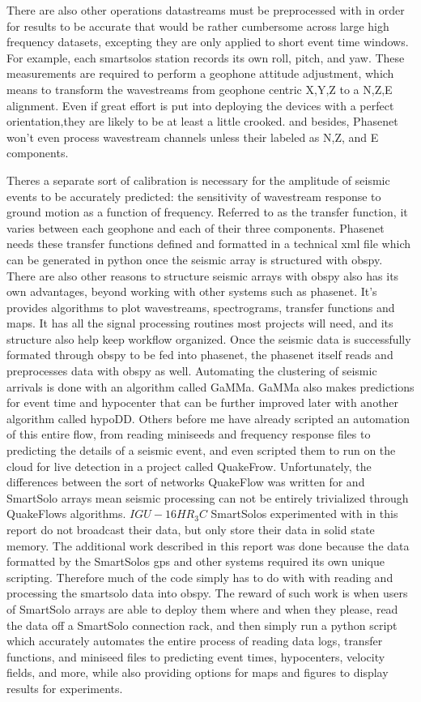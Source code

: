 There are also other operations datastreams must be preprocessed with in order for results to be accurate that would be rather cumbersome across large high frequency datasets, excepting they are only applied to short event time windows. 
For example, each smartsolos station records its own roll, pitch, and yaw. These measurements are required to perform a geophone attitude adjustment, which means to transform the wavestreams from geophone centric X,Y,Z to a  N,Z,E alignment. 
 Even if great effort is put into deploying the devices with a perfect orientation,they are likely to be at least a little crooked. and besides, Phasenet won't even process wavestream channels unless their labeled as N,Z, and E components. 

Theres a separate sort of calibration is necessary for the amplitude of seismic events to be accurately predicted: the sensitivity of wavestream response to ground motion as a function of frequency. Referred to as the transfer function, it varies between each geophone and each of their three components. 
Phasenet needs these transfer functions defined and formatted in a technical xml file which can be generated in python once the seismic array is structured with obspy.
There are also other reasons to structure seismic arrays with obspy also has its own advantages, beyond working with other systems such as phasenet. It's provides algorithms to plot wavestreams, spectrograms, transfer functions and  maps. 
It has all the signal processing routines most projects will need, and its structure also help keep workflow organized.
Once the seismic data is successfully formated through obspy to be fed into phasenet, the phasenet itself reads and preprocesses data with obspy as well.
Automating the clustering of seismic arrivals is done with an algorithm called GaMMa.  GaMMa also makes predictions for event time and hypocenter that can be further improved later with another algorithm called hypoDD.
Others before me have already scripted an automation of this entire flow, from reading miniseeds and frequency response files to predicting the details of a seismic event, and even scripted them to run on the cloud for live detection 
in a project called QuakeFrow. Unfortunately, the differences between the sort of networks QuakeFlow was written for and SmartSolo arrays mean seismic processing can not be entirely trivialized through QuakeFlows algorithms.
$IGU-16HR_3C$ SmartSolos experimented with in this report do not broadcast their data, but only store their data in solid state memory. The additional work described in this report was done because the data formatted by the SmartSolos gps and other systems required
its own unique scripting. Therefore much of the code simply has to do with with reading and processing
the smartsolo data into obspy. The reward of such work is when users of SmartSolo arrays are able to deploy them where and when they please, read the data off a SmartSolo connection rack, and then simply run a python script which 
accurately automates the entire process of reading data logs, transfer functions, and miniseed files to predicting event times, hypocenters, velocity fields, and more, while also providing options for maps and figures to display results for experiments. 


